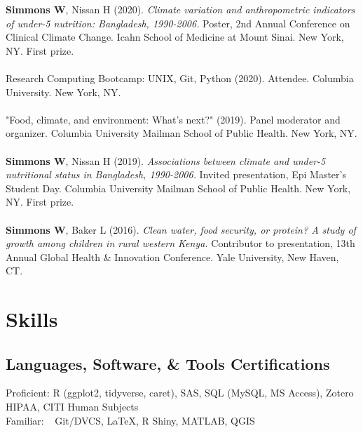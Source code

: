 \documentclass[hidelinks,10pt]{my_cv}
\begin{document}
{	\textbf{Simmons W}, Nissan H (2020). \textit{Climate variation and anthropometric indicators of under-5 nutrition: Bangladesh, 1990-2006.} Poster, 2nd Annual Conference on Clinical Climate Change. Icahn School of Medicine at Mount Sinai. New York, NY. First prize.
	\\ \\
	Research Computing Bootcamp: UNIX, Git, Python (2020). Attendee. Columbia University. New York, NY.
	\\ \\
	"Food, climate, and environment: What's next?" (2019). Panel moderator and organizer. Columbia University Mailman School of Public Health. New York, NY.
	\\ \\
	\textbf{Simmons W}, Nissan H (2019). \textit{Associations between climate and under-5 nutritional status in Bangladesh, 1990-2006.} Invited presentation, Epi Master’s Student Day. Columbia University Mailman School of Public Health. New York, NY. First prize.
	\\ \\
	\textbf{Simmons W}, Baker L (2016). \textit{Clean water, food security, or protein?  A study of growth among children in rural western Kenya.} Contributor to presentation, 13th Annual Global Health \& Innovation Conference. Yale University, New Haven, CT.


\section{Skills}

	\subsection{Languages, Software, \& Tools					\hfill				Certifications}
		\vspace{1mm}
		{Proficient: R (ggplot2, tidyverse, caret), SAS, SQL (MySQL, MS Access), Zotero		\hfill				HIPAA, CITI Human Subjects}
		\\{Familiar: \textcolor{white}{rr}Git/DVCS, \LaTeX, R Shiny, MATLAB, QGIS}  %
	

}
\end{document}
